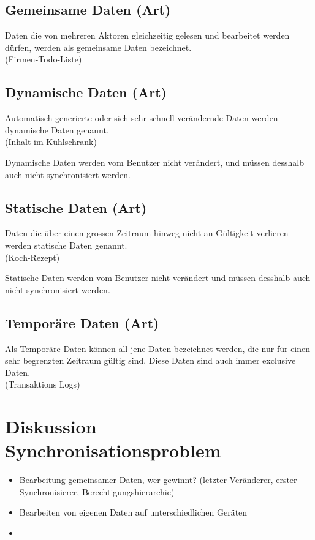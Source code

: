 \documentclass[oneside,11pt,parskip=half,ngerman]{scrreprt}
\begin{document}
\subsection{Gemeinsame Daten (Art)}\label{gemeinsame-daten-art}

Daten die von mehreren Aktoren gleichzeitig gelesen und bearbeitet
werden dürfen, werden als gemeinsame Daten
bezeichnet.\\(Firmen-Todo-Liste)

\subsection{Dynamische Daten (Art)}\label{dynamische-daten-art}

Automatisch generierte oder sich sehr schnell verändernde Daten werden
dynamische Daten genannt.\\(Inhalt im Kühlschrank)

Dynamische Daten werden vom Benutzer nicht verändert, und müssen
desshalb auch nicht synchronisiert werden.

\subsection{Statische Daten (Art)}\label{statische-daten-art}

Daten die über einen grossen Zeitraum hinweg nicht an Gültigkeit
verlieren werden statische Daten genannt.\\(Koch-Rezept)

Statische Daten werden vom Benutzer nicht verändert und müssen desshalb
auch nicht synchronisiert werden.

\subsection{Temporäre Daten (Art)}\label{temporuxe4re-daten-art}

Als Temporäre Daten können all jene Daten bezeichnet werden, die nur für
einen sehr begrenzten Zeitraum gültig sind. Diese Daten sind auch immer
exclusive Daten.\\(Transaktions Logs)

\section{Diskussion
Synchronisationsproblem}\label{diskussion-synchronisationsproblem}

\begin{itemize}
\item
  Bearbeitung gemeinsamer Daten, wer gewinnt? (letzter Veränderer,
  erster Synchronisierer, Berechtigungshierarchie)
\item
  Bearbeiten von eigenen Daten auf unterschiedlichen Geräten
\item
\end{itemize}
\end{document}
